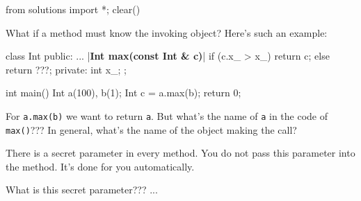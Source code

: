 \begin{python0}
from solutions import *; clear()
\end{python0}

What if a method must know the invoking object? Here's
such an example:

\begin{consolethree}[escapeinside=||]
class Int
{
public:
    ...
    |\textbf{Int max(const Int \& c)}|
    {
        if (c.x_ > x_)
        {
            return c;
        }
        else
        {
            return ???;
        }
    }
private:
    int x_;
};
\end{consolethree}

\begin{consolethree}[escapeinside=||]
int main()
{
    Int a(100), b(1);
    Int c = a.max(b);
    return 0;
}
\end{consolethree}

For \texttt{a.max(b)} we want to return \texttt{a}. But what's the name of
\texttt{a} in the code of \texttt{max()}??? In general, what's the name of
the object making the call?

There is a secret parameter in every method. You do not pass this
parameter into the method. It's done for you automatically.

What is this secret parameter??? ...


